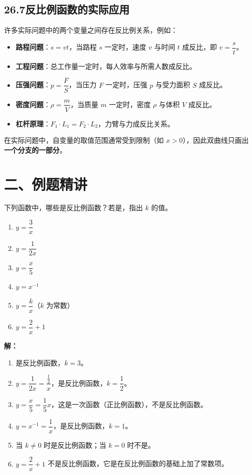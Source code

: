 \documentclass[12pt, a4paper]{ctexart}
\begin{document}
\subsection*{26.7\quad 反比例函数的实际应用}

\begin{knowledgebox}[7. 反比例函数在实际问题中的应用]
许多实际问题中的两个变量之间存在反比例关系，例如：
\begin{itemize}[leftmargin=2em]
  \item \textbf{路程问题}：$s = vt$，当路程 $s$ 一定时，速度 $v$ 与时间 $t$ 成反比，即 $v = \dfrac{s}{t}$。
  \item \textbf{工程问题}：总工作量一定时，每人效率与所需人数成反比。
  \item \textbf{压强问题}：$p = \dfrac{F}{S}$，当压力 $F$ 一定时，压强 $p$ 与受力面积 $S$ 成反比。
  \item \textbf{密度问题}：$\rho = \dfrac{m}{V}$，当质量 $m$ 一定时，密度 $\rho$ 与体积 $V$ 成反比。
  \item \textbf{杠杆原理}：$F_1 \cdot L_1 = F_2 \cdot L_2$，力臂与力成反比关系。
\end{itemize}

\medskip
在实际问题中，自变量的取值范围通常受到限制（如 $x > 0$），因此双曲线只画出\textbf{一个分支的一部分}。
\end{knowledgebox}

\newpage
\section*{\textcolor{examorange}{二、例题精讲}}

\begin{examplebox}[【例1】判断反比例函数]
下列函数中，哪些是反比例函数？若是，指出 $k$ 的值。
\begin{enumerate}[label=(\arabic*)]
  \item $y = \dfrac{3}{x}$
  \item $y = \dfrac{1}{2x}$
  \item $y = \dfrac{x}{5}$
  \item $y = x^{-1}$
  \item $y = \dfrac{k}{x}$（$k$ 为常数）
  \item $y = \dfrac{2}{x} + 1$
\end{enumerate}
\end{examplebox}

\textbf{解：}
\begin{enumerate}[label=(\arabic*)]
  \item 是反比例函数，$k = 3$。
  \item $y = \dfrac{1}{2x} = \dfrac{\frac{1}{2}}{x}$，是反比例函数，$k = \dfrac{1}{2}$。
  \item $y = \dfrac{x}{5} = \dfrac{1}{5}x$，这是一次函数（正比例函数），不是反比例函数。
  \item $y = x^{-1} = \dfrac{1}{x}$，是反比例函数，$k = 1$。
  \item 当 $k \neq 0$ 时是反比例函数；当 $k = 0$ 时不是。
  \item $y = \dfrac{2}{x} + 1$ 不是反比例函数，它是在反比例函数的基础上加了常数项。
\end{enumerate}
\end{document}
